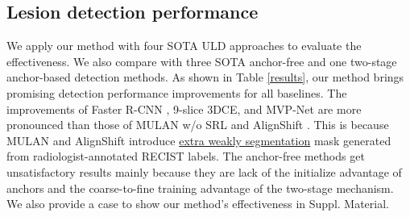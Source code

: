 \documentclass[runningheads]{llncs}
\newcommand{\ucite}[1]{\cite{#1}} 
\begin{document}
\subsection{Lesion detection performance}

We apply our method with four SOTA ULD approaches \ucite{yan20183DCE,li2019mvp,yan2019mulan,yang2020alignshift} to evaluate the effectiveness. We also compare with three SOTA anchor-free  \ucite{tian2019fcos,zhou2019objectsaspotints,zhu2020deformable}  and  one two-stage anchor-based  \ucite{ren2015fasterrcnn} detection methods. As shown in Table \ref{results},  our method brings promising detection performance improvements for all baselines. The improvements of Faster R-CNN \cite{ren2015fasterrcnn}, 9-slice 3DCE, and MVP-Net are more pronounced than those of MULAN w/o SRL\cite{yan2019mulan} and AlignShift \cite{yang2020alignshift}. This is because MULAN and AlignShift introduce \underline{extra weakly segmentation} mask generated from radiologist-annotated RECIST labels.  The anchor-free methods get unsatisfactory results mainly because they are lack of the initialize advantage of anchors and the coarse-to-fine training advantage of the two-stage mechanism. We also provide a case to show our method's effectiveness in Suppl. Material.
\end{document}
